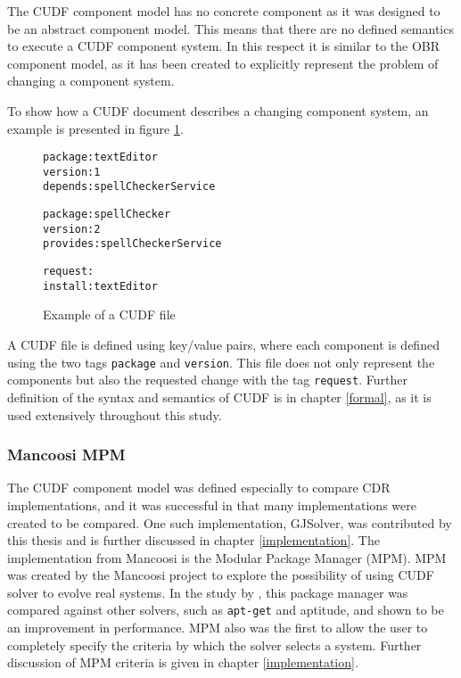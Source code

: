 The CUDF component model has no concrete component as it was designed to be an abstract component model.
This means that there are no defined semantics to execute a CUDF component system.
In this respect it is similar to the OBR component model, as it has been created to explicitly represent the problem of changing a component system.

To show how a CUDF document describes a changing component system, an example is presented in figure \ref{CUDFmetadata}.

\begin{figure}[htp] 
\begin{center}
\begin{framed}
\begin{alltt}
package: textEditor
version: 1
depends: spellCheckerService

package: spellChecker
version: 2
provides: spellCheckerService

request:
install:textEditor
\end{alltt}
\end{framed}
  \caption{Example of a CUDF file}
  \label{CUDFmetadata}
\end{center}
\end{figure}

A CUDF file is defined using key/value pairs, where each component is defined using the two tags \texttt{package} and \texttt{version}.
This file does not only represent the components but also the requested change with the tag \texttt{request}.
Further definition of the syntax and semantics of CUDF is in chapter \ref{formal}, as it is used extensively throughout this study.

\subsubsection{Mancoosi MPM}
The CUDF component model was defined especially to compare CDR implementations, and it was successful in that many implementations were created to be compared.
One such implementation, GJSolver, was contributed by this thesis and is further discussed in chapter \ref{implementation}.
The implementation from Mancoosi is the Modular Package Manager \citep{abate2011} (MPM).
MPM was created by the Mancoosi project to explore the possibility of using CUDF solver to evolve real systems.
In the study by \cite{abate2011}, this package manager was compared against other solvers, such as \texttt{apt-get} and aptitude, and shown to be an improvement in performance.
MPM also was the first to allow the user to completely specify the criteria by which the solver selects a system.
Further discussion of MPM criteria is given in chapter \ref{implementation}. 

